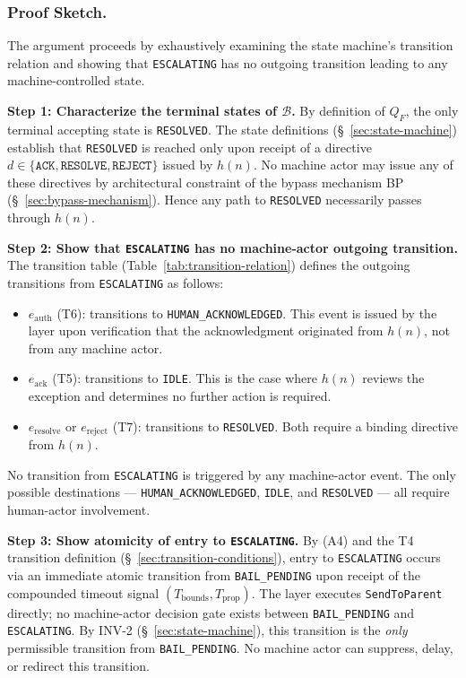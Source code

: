 \subsubsection{Proof Sketch.}

The argument proceeds by exhaustively examining the state machine's transition relation and showing that \texttt{ESCALATING} has no outgoing transition leading to any machine-controlled state.

\medskip
\noindent\textbf{Step 1: Characterize the terminal states of $\mathcal{B}$.} By definition of $Q_F$, the only terminal accepting state is \texttt{RESOLVED}. The state definitions (\S~\ref{sec:state-machine}) establish that \texttt{RESOLVED} is reached only upon receipt of a directive $d \in \{\texttt{ACK}, \texttt{RESOLVE}, \texttt{REJECT}\}$ issued by $h(n)$. No machine actor may issue any of these directives by architectural constraint of the bypass mechanism BP (\S~\ref{sec:bypass-mechanism}). Hence any path to \texttt{RESOLVED} necessarily passes through $h(n)$.

\medskip
\noindent\textbf{Step 2: Show that \texttt{ESCALATING} has no machine-actor outgoing transition.} The transition table (Table~\ref{tab:transition-relation}) defines the outgoing transitions from \texttt{ESCALATING} as follows:
\begin{itemize}
\item $e_{\text{auth}}$ (T6): transitions to \texttt{HUMAN\_ACKNOWLEDGED}. This event is issued by the \fact{} layer upon verification that the acknowledgment originated from $h(n)$, not from any machine actor.
\item $e_{\text{ack}}$ (T5): transitions to \texttt{IDLE}. This is the case where $h(n)$ reviews the exception and determines no further action is required.
\item $e_{\text{resolve}}$ or $e_{\text{reject}}$ (T7): transitions to \texttt{RESOLVED}. Both require a binding directive from $h(n)$.
\end{itemize}
No transition from \texttt{ESCALATING} is triggered by any machine-actor event. The only possible destinations — \texttt{HUMAN\_ACKNOWLEDGED}, \texttt{IDLE}, and \texttt{RESOLVED} — all require human-actor involvement.

\medskip
\noindent\textbf{Step 3: Show atomicity of entry to \texttt{ESCALATING}.} By (A4) and the T4 transition definition (\S~\ref{sec:transition-conditions}), entry to \texttt{ESCALATING} occurs via an immediate atomic transition from \texttt{BAIL\_PENDING} upon receipt of the compounded timeout signal $(T_{\text{bounds}}, T_{\text{prop}})$. The \fact{} layer executes \texttt{SendToParent} directly; no machine-actor decision gate exists between \texttt{BAIL\_PENDING} and \texttt{ESCALATING}. By INV-2 (\S~\ref{sec:state-machine}), this transition is the \emph{only} permissible transition from \texttt{BAIL\_PENDING}. No machine actor can suppress, delay, or redirect this transition.

